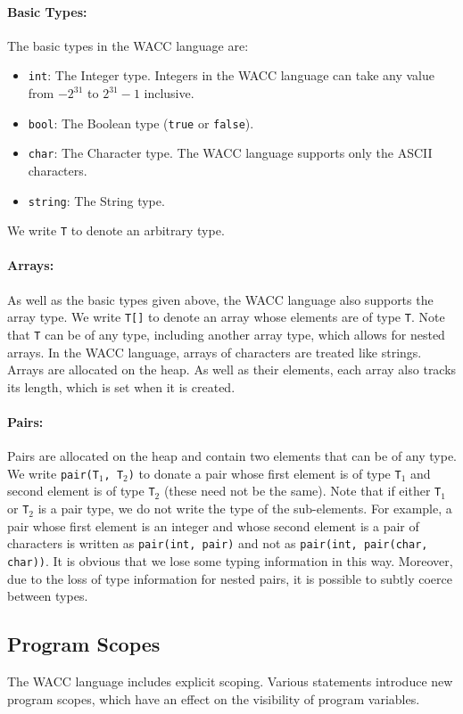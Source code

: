 \documentclass[a4paper]{article}
\newcommand{\shell}[1]{\lstinline{#1}}
\theoremstyle{definition}
\begin{document}
\paragraph{Basic Types:}
The basic types in the WACC language are:
\begin{itemize}
  \item \texttt{int}: The Integer type. Integers in the WACC language can take any value from $-2^{31}$ to $2^{31} - 1$ inclusive.
  \item \texttt{bool}: The Boolean type (\shell{true} or \shell{false}).
  \item \texttt{char}: The Character type. The WACC language supports only the ASCII characters.
  \item \texttt{string}: The String type.
\end{itemize}
We write \texttt{T} to denote an arbitrary type.

\paragraph{Arrays:}
As well as the basic types given above, the WACC language also supports the array type.
We write \texttt{T[]} to denote an array whose elements are of type \texttt{T}.
Note that \texttt{T} can be of any type, including another array type, which allows for nested arrays.
In the WACC language, arrays of characters are treated like strings.
Arrays are allocated on the heap.
As well as their elements, each array also tracks its length, which is set when it is created.

\paragraph{Pairs:}
Pairs are allocated on the heap and contain two elements that can be of any type.
We write \texttt{pair(T$_1$, T$_2$)} to donate a pair whose first element is of type \texttt{T$_1$} and second element is of type \texttt{T$_2$}
(these need not be the same).
Note that if either \texttt{T$_1$} or \texttt{T$_2$} is a pair type, we do not write the type of the sub-elements.
For example, a pair whose first element is an integer
and whose second element is a pair of characters is written as \texttt{pair(int, pair)} and not as \texttt{pair(int, pair(char, char))}.
It is obvious that we lose some typing information in this way.
Moreover, due to the loss of type information for nested pairs, it is possible to subtly coerce between types.

\subsection{Program Scopes}
The WACC language includes explicit scoping.
Various statements introduce new program scopes, which have an effect on the visibility of program variables.
\end{document}
